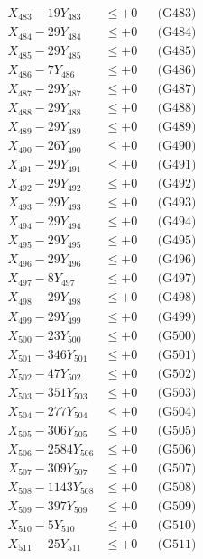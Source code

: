 \documentclass[a4paper,10pt]{article}
\begin{document}
{\begin{align}
X_{483} - 19Y_{483} &\leq +0 && \text{(G483)} \\
X_{484} - 29Y_{484} &\leq +0 && \text{(G484)} \\
X_{485} - 29Y_{485} &\leq +0 && \text{(G485)} \\
X_{486} - 7Y_{486} &\leq +0 && \text{(G486)} \\
X_{487} - 29Y_{487} &\leq +0 && \text{(G487)} \\
X_{488} - 29Y_{488} &\leq +0 && \text{(G488)} \\
X_{489} - 29Y_{489} &\leq +0 && \text{(G489)} \\
X_{490} - 26Y_{490} &\leq +0 && \text{(G490)} \\
\allowbreak
X_{491} - 29Y_{491} &\leq +0 && \text{(G491)} \\
X_{492} - 29Y_{492} &\leq +0 && \text{(G492)} \\
X_{493} - 29Y_{493} &\leq +0 && \text{(G493)} \\
X_{494} - 29Y_{494} &\leq +0 && \text{(G494)} \\
X_{495} - 29Y_{495} &\leq +0 && \text{(G495)} \\
X_{496} - 29Y_{496} &\leq +0 && \text{(G496)} \\
X_{497} - 8Y_{497} &\leq +0 && \text{(G497)} \\
X_{498} - 29Y_{498} &\leq +0 && \text{(G498)} \\
X_{499} - 29Y_{499} &\leq +0 && \text{(G499)} \\
X_{500} - 23Y_{500} &\leq +0 && \text{(G500)} \\
\allowbreak
X_{501} - 346Y_{501} &\leq +0 && \text{(G501)} \\
X_{502} - 47Y_{502} &\leq +0 && \text{(G502)} \\
X_{503} - 351Y_{503} &\leq +0 && \text{(G503)} \\
X_{504} - 277Y_{504} &\leq +0 && \text{(G504)} \\
X_{505} - 306Y_{505} &\leq +0 && \text{(G505)} \\
X_{506} - 2584Y_{506} &\leq +0 && \text{(G506)} \\
X_{507} - 309Y_{507} &\leq +0 && \text{(G507)} \\
X_{508} - 1143Y_{508} &\leq +0 && \text{(G508)} \\
X_{509} - 397Y_{509} &\leq +0 && \text{(G509)} \\
X_{510} - 5Y_{510} &\leq +0 && \text{(G510)} \\
\allowbreak
X_{511} - 25Y_{511} &\leq +0 && \text{(G511)} \\

\end{align}}
\end{document}
